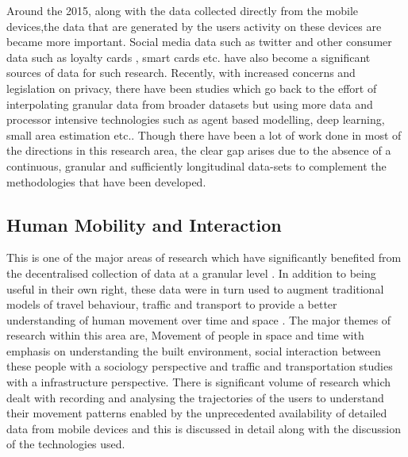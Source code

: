 Around the 2015, along with the data collected directly from the mobile devices,the data that are generated by the users activity on these devices are became more important.
Social media data such as twitter \citep{lansley2016a} and other consumer data such as loyalty cards \citep{lloyd2018}, smart cards \citep{ordonez2012} etc. have also become a significant sources of data for such research.
Recently, with increased concerns and legislation on privacy, there have been studies which go back to the effort of interpolating granular data from broader datasets but using more data and processor intensive technologies such as agent based modelling, deep learning, small area estimation \citep{crols2019, shibata2019, rao2015} etc..
Though there have been a lot of work done in most of the directions in this research area, the clear gap arises due to the absence of a continuous, granular and sufficiently longitudinal data-sets to complement the methodologies that have been developed. 

\subsection{Human Mobility and Interaction}

This is one of the major areas of research which have significantly benefited from the decentralised collection of data at a granular level \cite{castells2000}.
In addition to being useful in their own right, these data were in turn used to augment traditional models of travel behaviour, traffic and transport to provide a better understanding of human movement over time and space \citep{janssens2013}.
The major themes of research within this area are, Movement of people in space and time with emphasis on understanding the built environment, social interaction between these people with a sociology perspective and traffic and transportation studies with a infrastructure perspective.
There is significant volume of research which dealt with recording and analysing the trajectories of the users to understand their movement patterns enabled by the unprecedented availability of detailed data from mobile devices and this is discussed in detail along with the discussion of the technologies used.

\lipsum[1]

